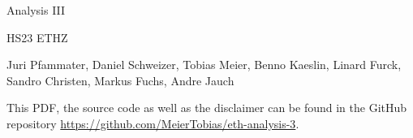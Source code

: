 \documentclass[a4paper,10pt,landscape]{scrartcl}
\begin{document}
\begin{multicols*}{3}

\begin{center}
    \huge{Analysis III \par}
    \vspace{0.1cm}
    \large{HS23 ETHZ\par}
    \vspace{0.3cm}
    \normalsize{Juri Pfammater, Daniel Schweizer, Tobias Meier, Benno Kaeslin, Linard Furck, Sandro Christen, Markus Fuchs, Andre Jauch}
    \vspace{0.3cm}
\end{center}  
This PDF, the source code as well as the disclaimer can be found in the GitHub repository \url{https://github.com/MeierTobias/eth-analysis-3}.
\vspace{0.2cm}









%

\end{multicols*}
\end{document}
